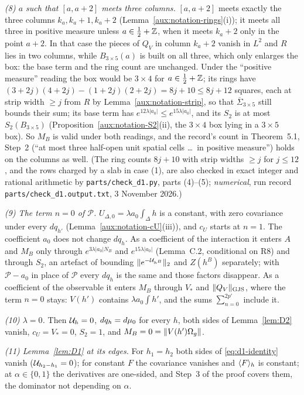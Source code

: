 \emph{(8) $a$ such that $[a,a+2]$ meets three columns.} $[a,a+2]$ meets exactly the three
columns $k_a,k_a+1,k_a+2$ (Lemma~\ref{aux:notation-rings}(i)); it meets all three in positive
measure unless $a\in\frac12+\mathbb{Z}$, when it meets $k_a+2$ only in the point $a+2$. In that case
the pieces of $Q_V$ in column $k_a+2$ vanish in $L^2$ and $R$ lies in two columns, while
$B_{3\times5}(a)$ is built on all three, which only enlarges the box: the base term and the ring
count are unchanged. Under the ``positive measure'' reading the box would be $3\times4$ for
$a\in\frac12+\mathbb{Z}$; its rings have $(3+2j)(4+2j)-(1+2j)(2+2j)=8j+10\le8j+12$ squares, each at
strip width $\ge j$ from $R$ by Lemma~\ref{aux:notation-strip}, so that
$\overline\Sigma_{3\times5}$ still bounds their sum; its base
term has $e^{12\lambda|a_0|}\le e^{15\lambda|a_0|}$, and its $S_2$ is at most $S_2(B_{3\times5})$
(Proposition~\ref{aux:notation-S2}(ii), the $3\times4$ box lying in a $3\times5$ box). So $M_B$
is valid under both readings, and the record's count in Theorem~5.1, Step~2 (``at most three
half-open unit spatial cells \dots\ in positive measure'') holds on the columns as well.  (The
ring counts $8j+10$ with strip widths $\ge j$ for $j\le12$, and the rows charged by a slab in case
(1), are also checked in exact integer and rational arithmetic by \texttt{parts/check\_d1.py},
parts (4)--(5); \emph{numerical}, run record \texttt{parts/}\allowbreak\texttt{check\_d1.output.txt}, 3 November 2026.)

\emph{(9) The term $n=0$ of $\mathscr P$.} $U_{\Delta,0}=\lambda a_0\int_\Delta h$ is a
constant, with zero covariance under every $dq_{h'}$ (Lemma~\ref{aux:notation-cU}(iii)), and
$c_U$ starts at $n=1$. The coefficient $a_0$ does not change $dq_h$. As a coefficient of the
interaction it enters $A$ and $M_B$ only through $e^{3\lambda|a_0|N_B}$ and $e^{15\lambda|a_0|}$
(Lemma~C.2, conditional on R8) and through $S_2$, an artefact of bounding
$\|e^{-\mathcal U_{h^B}}\|_2$ and $Z(h^B)$ separately; with $\mathscr P-a_0$ in place of $\mathscr P$
every $dq_h$ is the same and those factors disappear. As a coefficient of the observable it
enters $M_B$ through $V_*$ and $\lVert Q_V\rVert_{\mathrm{GJS}}$, where the term $n=0$ stays: $V(h')$ contains
$\lambda a_0\int h'$, and the sums $\sum_{n=0}^{2p'}$ include it.

\emph{(10) $\lambda=0$.} Then $\mathcal U_h=0$, $dq_h=d\mu_0$ for every $h$, both sides of
Lemma~\ref{lem:D2} vanish, $c_U=V_*=0$, $S_2=1$, and $M_B=0=\|V(h')\Omega_g\|$.

\emph{(11) Lemma~\ref{lem:D1} at its edges.} For $h_1=h_2$ both sides of
\eqref{eq:d1-identity} vanish ($\mathcal U_{h_2-h_1}=0$); for constant $F$ the covariance vanishes and
$\langle F\rangle_{h}$ is constant; at $\alpha\in\{0,1\}$ the derivatives are one-sided, and Step~3 of the
proof covers them, the dominator not depending on $\alpha$.
